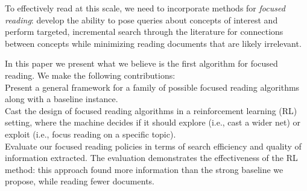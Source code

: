 To effectively read at this scale, we need to incorporate methods for {\em focused reading}: develop the ability to pose queries about concepts of interest and perform targeted, incremental search through the literature for connections between concepts while minimizing reading documents that are likely irrelevant.

In this paper we present what we believe is the first algorithm for focused reading.  We make the following contributions:\\
{} Present a general framework for a family of possible focused reading algorithms along with a baseline instance.\\
{} Cast the design of focused reading algorithms in a reinforcement learning (RL) setting, where the machine decides if it should explore (i.e., cast a wider net) or exploit (i.e., focus reading on a specific topic).\\
{} Evaluate our focused reading policies in terms of search efficiency and quality of information extracted. The evaluation demonstrates the effectiveness of the RL method: this approach found more information than the strong baseline we propose, while reading fewer documents. 
